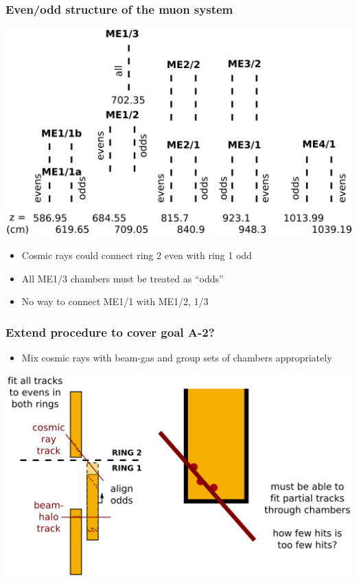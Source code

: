 \documentclass[compress]{beamer}
\begin{document}
\begin{frame}
\frametitle{Even/odd structure of the muon system}
\includegraphics[width=\linewidth]{evenodd.png}
\begin{itemize}
\item Cosmic rays could connect ring 2 even with ring 1 odd
\item All ME1/3 chambers must be treated as ``odds''
\item No way to connect ME1/1 with ME1/2, 1/3
\end{itemize}
\end{frame}

\begin{frame}
\frametitle{Extend procedure to cover goal A-2?}
\vspace{-0.25 cm}
\begin{itemize}
\item Mix cosmic rays with beam-gas and group sets of chambers appropriately
\end{itemize}

\vspace{0.25 cm}
\includegraphics[width=\linewidth]{illustration-A2.png}
\end{frame}
\end{document}
